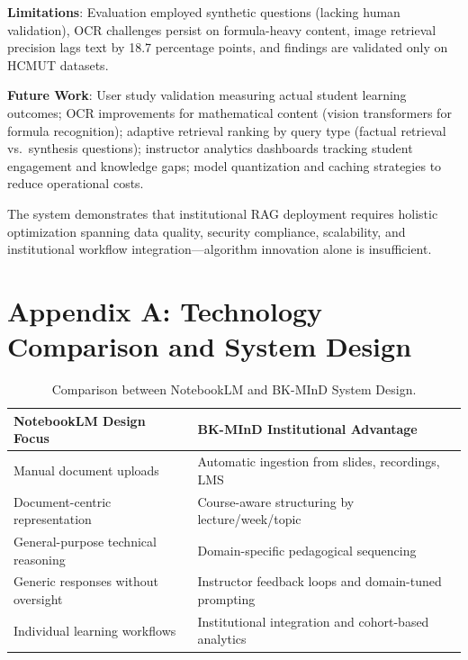 \documentclass[11pt,a4paper,twocolumn]{article}
\begin{document}
\textbf{Limitations}: Evaluation employed synthetic questions (lacking human validation), OCR challenges persist on formula-heavy content, image retrieval precision lags text by 18.7 percentage points, and findings are validated only on HCMUT datasets.

\textbf{Future Work}: User study validation measuring actual student learning outcomes; OCR improvements for mathematical content (vision transformers for formula recognition); adaptive retrieval ranking by query type (factual retrieval vs.\ synthesis questions); instructor analytics dashboards tracking student engagement and knowledge gaps; model quantization and caching strategies to reduce operational costs.

The system demonstrates that institutional RAG deployment requires holistic optimization spanning data quality, security compliance, scalability, and institutional workflow integration—algorithm innovation alone is insufficient.

\onecolumn




\appendix
\twocolumn

\section*{Appendix A: Technology Comparison and System Design}

\begin{table}[t]
\caption{Comparison between NotebookLM and BK-MInD System Design.}
\label{tab:notebooklm-comparison}
\centering
\begin{tabular}{p{4.2cm}p{4.2cm}}
\toprule
\textbf{NotebookLM Design Focus} & \textbf{BK-MInD Institutional Advantage} \\
\midrule
Manual document uploads & Automatic ingestion from slides, recordings, LMS \\
Document-centric representation & Course-aware structuring by lecture/week/topic \\
General-purpose technical reasoning & Domain-specific pedagogical sequencing \\
Generic responses without oversight & Instructor feedback loops and domain-tuned prompting \\
Individual learning workflows & Institutional integration and cohort-based analytics \\
\bottomrule
\end{tabular}
\end{table}
\end{document}
